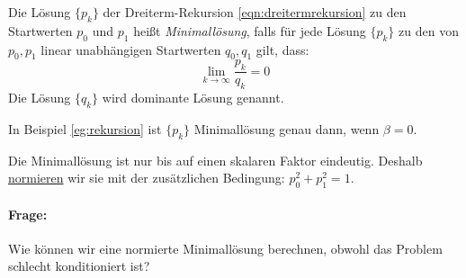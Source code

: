 \begin{definition}[Minimallösung]
Die Lösung $\{p_k\}$ der Dreiterm-Rekursion \eqref{eqn:dreitermrekursion} zu den Startwerten $p_0$ und $p_1$ heißt \emph{Minimallösung}, falls für jede Lösung $\{p_k\}$ zu den von $p_0,p_1$ linear unabhängigen Startwerten $q_0,q_1$ gilt, dass:
\[
\lim_{k \to \infty} \frac{p_k}{q_k}=0
\]
Die Lösung $\{q_k\}$ wird dominante Lösung genannt.
\end{definition}
\begin{example}
In Beispiel \ref{eg:rekursion} ist $\{p_k\}$ Minimallösung genau dann, wenn $\beta=0$.
\end{example}
Die Minimallösung ist nur bis auf einen skalaren Faktor eindeutig. Deshalb \underline{normieren} wir sie mit der zusätzlichen Bedingung: $p_0^2+p_1^2=1$.
\paragraph{Frage:} Wie können wir eine normierte Minimallösung berechnen, obwohl das Problem schlecht konditioniert ist?
